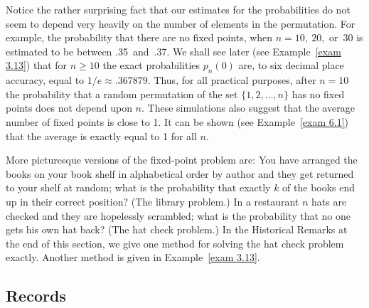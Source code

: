 Notice the rather surprising fact that our estimates for the probabilities do not seem
to depend very heavily on the number of elements in the permutation.  For example, the
probability that there are no fixed points, when $n = 10,\ 20,$ or~30 is estimated
to be between .35~and~.37.  We shall see later (see Example~\ref{exam 3.13}) that for $n \geq 10$
the exact probabilities $p_n(0)$ are, to six decimal place accuracy, equal to $1/e \approx
.367879$.  Thus, for all practical purposes, after $n = 10$ the probability that a random
permutation of the set $\{1, 2, \ldots, n\}$ has no fixed points does not depend upon $n$.  These
simulations also suggest that the average number of fixed points is close to 1.  It can be shown
(see Example~\ref{exam 6.1}) that the average is exactly equal to 1 for all $n$.
\par
More picturesque versions of the fixed-point problem are: You have arranged the books on your
book shelf in alphabetical order by author and they get returned to your shelf at
random; what is the probability that exactly $k$ of the books end up in their correct
position?  (The library problem.)  In a restaurant $n$ hats are checked and
they are hopelessly scrambled; what is the probability that no one gets his own hat back?  (The
hat check problem.)  In the Historical Remarks at the end of this
section, we give one method for solving the hat check problem exactly.  Another method is given
in Example~\ref{exam 3.13}.  


\subsection*{Records}

